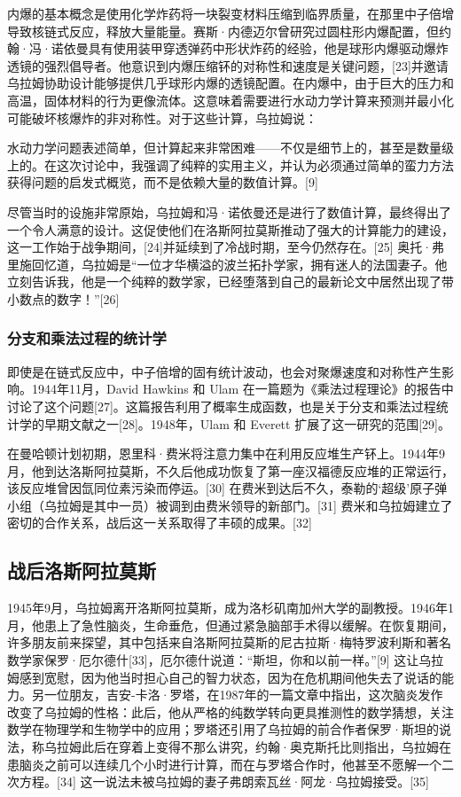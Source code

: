 内爆的基本概念是使用化学炸药将一块裂变材料压缩到临界质量，在那里中子倍增导致核链式反应，释放大量能量。赛斯·内德迈尔曾研究过圆柱形内爆配置，但约翰·冯·诺依曼具有使用装甲穿透弹药中形状炸药的经验，他是球形内爆驱动爆炸透镜的强烈倡导者。他意识到内爆压缩钚的对称性和速度是关键问题，[23]并邀请乌拉姆协助设计能够提供几乎球形内爆的透镜配置。在内爆中，由于巨大的压力和高温，固体材料的行为更像流体。这意味着需要进行水动力学计算来预测并最小化可能破坏核爆炸的非对称性。对于这些计算，乌拉姆说：

水动力学问题表述简单，但计算起来非常困难——不仅是细节上的，甚至是数量级上的。在这次讨论中，我强调了纯粹的实用主义，并认为必须通过简单的蛮力方法获得问题的启发式概览，而不是依赖大量的数值计算。[9]

尽管当时的设施非常原始，乌拉姆和冯·诺依曼还是进行了数值计算，最终得出了一个令人满意的设计。这促使他们在洛斯阿拉莫斯推动了强大的计算能力的建设，这一工作始于战争期间，[24]并延续到了冷战时期，至今仍然存在。[25] 奥托·弗里施回忆道，乌拉姆是“一位才华横溢的波兰拓扑学家，拥有迷人的法国妻子。他立刻告诉我，他是一个纯粹的数学家，已经堕落到自己的最新论文中居然出现了带小数点的数字！”[26]
\subsubsection{分支和乘法过程的统计学 } 
即使是在链式反应中，中子倍增的固有统计波动，也会对聚爆速度和对称性产生影响。1944年11月，David Hawkins 和 Ulam 在一篇题为《乘法过程理论》的报告中讨论了这个问题[27]。这篇报告利用了概率生成函数，也是关于分支和乘法过程统计学的早期文献之一[28]。1948年，Ulam 和 Everett 扩展了这一研究的范围[29]。

在曼哈顿计划初期，恩里科·费米将注意力集中在利用反应堆生产钚上。1944年9月，他到达洛斯阿拉莫斯，不久后他成功恢复了第一座汉福德反应堆的正常运行，该反应堆曾因氙同位素污染而停运。[30] 在费米到达后不久，泰勒的‘超级’原子弹小组（乌拉姆是其中一员）被调到由费米领导的新部门。[31] 费米和乌拉姆建立了密切的合作关系，战后这一关系取得了丰硕的成果。[32]
\subsection{战后洛斯阿拉莫斯}  
1945年9月，乌拉姆离开洛斯阿拉莫斯，成为洛杉矶南加州大学的副教授。1946年1月，他患上了急性脑炎，生命垂危，但通过紧急脑部手术得以缓解。在恢复期间，许多朋友前来探望，其中包括来自洛斯阿拉莫斯的尼古拉斯·梅特罗波利斯和著名数学家保罗·厄尔德什[33]，厄尔德什说道：“斯坦，你和以前一样。”[9] 这让乌拉姆感到宽慰，因为他当时担心自己的智力状态，因为在危机期间他失去了说话的能力。另一位朋友，吉安-卡洛·罗塔，在1987年的一篇文章中指出，这次脑炎发作改变了乌拉姆的性格：此后，他从严格的纯数学转向更具推测性的数学猜想，关注数学在物理学和生物学中的应用；罗塔还引用了乌拉姆的前合作者保罗·斯坦的说法，称乌拉姆此后在穿着上变得不那么讲究，约翰·奥克斯托比则指出，乌拉姆在患脑炎之前可以连续几个小时进行计算，而在与罗塔合作时，他甚至不愿解一个二次方程。[34] 这一说法未被乌拉姆的妻子弗朗索瓦丝·阿龙·乌拉姆接受。[35]

